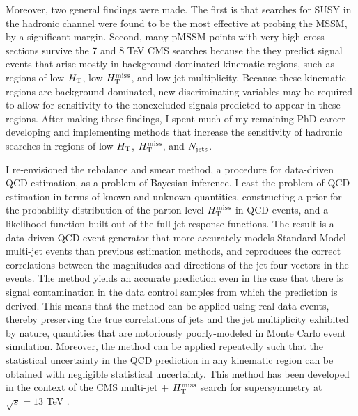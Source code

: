 Moreover, two general findings were made. The first is that searches for SUSY in the hadronic channel were found to be the most effective at probing the MSSM, by a significant margin. Second, many pMSSM points with very high cross sections survive the 7 and 8 TeV CMS searches because the they predict signal events that arise mostly in background-dominated kinematic regions, such as regions of low-$H_{\rm T}$, low-$H_{\text{T}}^{\rm miss}$, and low jet multiplicity. Because these kinematic regions are background-dominated, new discriminating variables may be required to allow for sensitivity to the nonexcluded signals predicted to appear in these regions. After making these findings, I spent much of my remaining PhD career developing and implementing methods that increase the sensitivity of hadronic searches in regions of low-$H_{\rm T}$, $H_{\text{T}}^{\rm miss}$, and $N_{\rm jets}$. 

I re-envisioned the rebalance and smear method, a procedure for data-driven QCD estimation, as a problem of Bayesian inference. I cast the problem of QCD estimation in terms of known and unknown quantities, constructing a prior for the probability distribution of the parton-level $H_{\text{T}}^{\rm miss}$ in QCD events, and a likelihood function built out of the full jet response functions. The result is a data-driven QCD event generator that more accurately models Standard Model multi-jet events than previous estimation methods, and reproduces the correct correlations between the magnitudes and directions of the jet four-vectors in the events. The method yields an accurate prediction even in the case that there is signal contamination in the data control samples from which the prediction is derived. This means that the method can be applied using real data events, thereby preserving the true correlations of jets and the jet multiplicity exhibited by nature, quantities that are notoriously poorly-modeled in Monte Carlo event simulation. Moreover, the method can be applied repeatedly such that the statistical uncertainty in the QCD prediction in any kinematic region can be obtained with negligible statistical uncertainty. This method has been developed in the context of the CMS multi-jet $+$ $H_{\text{T}}^{\rm miss}$ search for supersymmetry at $\sqrt{s}=13$ TeV \cite{Khachatryan:2016kdk}. 

